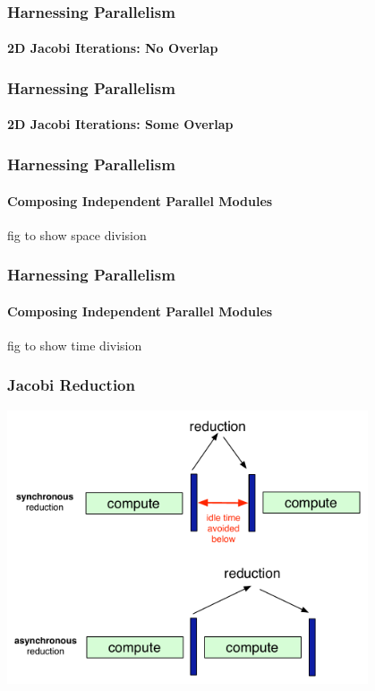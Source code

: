 \begin{frame}[fragile]
\frametitle{Harnessing Parallelism}
\framesubtitle{2D Jacobi Iterations: No Overlap}
    
\end{frame}


\begin{frame}[fragile]
\frametitle{Harnessing Parallelism}
\framesubtitle{2D Jacobi Iterations: Some Overlap}
    
\end{frame}


\begin{frame}[fragile]
\frametitle{Harnessing Parallelism}
\framesubtitle{Composing Independent Parallel Modules}
    fig to show space division
\end{frame}


\begin{frame}[fragile]
\frametitle{Harnessing Parallelism}
\framesubtitle{Composing Independent Parallel Modules}
    fig to show time division
\end{frame}

\begin{frame}
  \frametitle{Jacobi Reduction}
  \begin{center}
    \includegraphics[width=0.8\textwidth]{figures/asyncReduction.pdf}
  \end{center}
\end{frame}